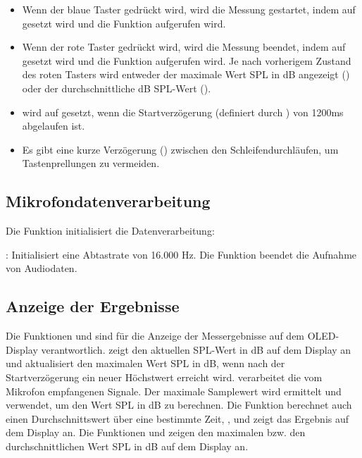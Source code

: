 \begin{itemize}
    \item Wenn der blaue Taster gedrückt wird, wird die Messung gestartet, indem  auf  gesetzt wird und die Funktion  aufgerufen wird.
    \item Wenn der rote Taster gedrückt wird, wird die Messung beendet, indem  auf  gesetzt wird und die Funktion  aufgerufen wird. Je nach vorherigem Zustand des roten Tasters wird entweder der maximale Wert SPL in dB angezeigt () oder der durchschnittliche dB SPL-Wert ().
    \item {} wird auf  gesetzt, wenn die Startverzögerung (definiert durch ) von 1200ms abgelaufen ist.
    \item Es gibt eine kurze Verzögerung () zwischen den Schleifendurchläufen, um Tastenprellungen zu vermeiden.
\end{itemize} 

\subsection{Mikrofondatenverarbeitung}

Die Funktion  initialisiert die Datenverarbeitung:

{
    \label{TestMicrophone:Init}
}


: Initialisiert eine Abtastrate von 16.000 Hz.
Die Funktion  beendet die Aufnahme von Audiodaten.


\subsection{Anzeige der Ergebnisse}

Die Funktionen  und  sind für die Anzeige der Messergebnisse auf dem OLED-Display verantwortlich.  zeigt den aktuellen SPL-Wert in dB auf dem Display an und aktualisiert den maximalen Wert SPL in dB, wenn nach der Startverzögerung ein neuer Höchstwert erreicht wird.  verarbeitet die vom Mikrofon empfangenen Signale. Der maximale Samplewert wird ermittelt und verwendet, um den Wert SPL in dB zu berechnen. Die Funktion berechnet auch einen Durchschnittswert über eine bestimmte Zeit, , und zeigt das Ergebnis auf dem Display an. Die Funktionen  und  zeigen den maximalen bzw. den durchschnittlichen Wert SPL in dB auf dem Display an.

